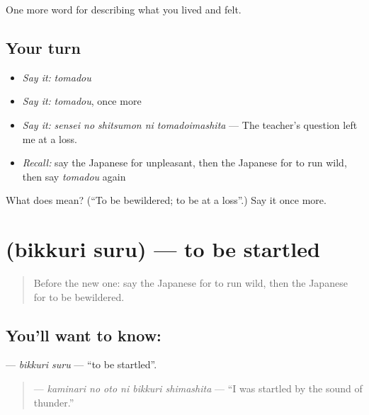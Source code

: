 \begin{grammarlens}[title={What you've built}]
One more word for describing what you lived and felt.
\end{grammarlens}

\subsection*{Your turn}
\begin{itemize}
\raggedright
  \item \emph{Say it:} \emph{tomadou}
  \item \emph{Say it:} \emph{tomadou}, once more
  \item \emph{Say it:} \emph{sensei no shitsumon ni tomadoimashita} — The teacher's question left me at a loss.
  \item \emph{Recall:} say the Japanese for unpleasant, then the Japanese for to run wild, then say \emph{tomadou} again
\end{itemize}

\begin{tcolorbox}[breakable,colback=teal!4,colframe=teal!35!black,title={Before you move on}]
What does  mean? (\textquotedblleft{}To be bewildered; to be at a loss\textquotedblright{}.) Say it once more.
\end{tcolorbox}
\section[\texorpdfstring{\ja{びっくりする} (bikkuri suru)}{びっくりする (bikkuri suru)}]{ (bikkuri suru) — to be startled}

\label{lesson:JA-C431-bikkuri-suru}



\begin{quote}
Before the new one: say the Japanese for to run wild, then the Japanese for to be bewildered.
\end{quote}

\subsection*{You'll want to know: }
\textbf{} — \emph{bikkuri suru} — \textquotedblleft{}to be startled\textquotedblright{}.

\begin{quote}
\textbf{  } — \emph{kaminari no oto ni bikkuri shimashita} — \textquotedblleft{}I was startled by the sound of thunder.\textquotedblright{}
\end{quote}

